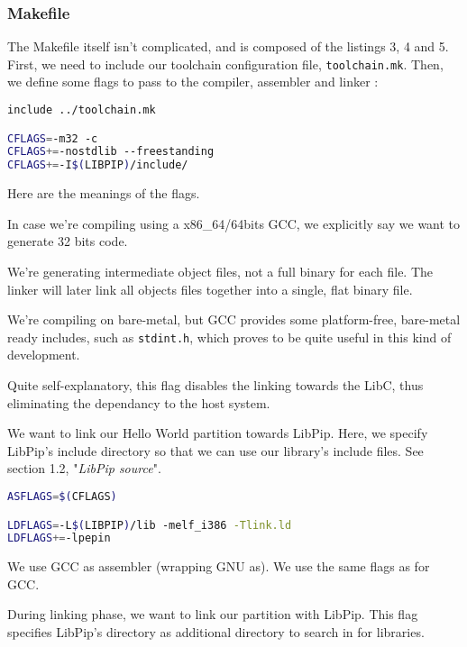 \documentclass[10pt,a4paper,titlepage]{refart}
\begin{document}
\subsubsection{Makefile}
The Makefile itself isn't complicated, and is composed of the listings 3, 4 and 5. First, we need to include our toolchain configuration file, \texttt{toolchain.mk}. Then, we define some flags to pass to the compiler, assembler and linker :
 \begin{lstlisting}[language=bash,caption={Makefile GCC flags}]
include ../toolchain.mk

CFLAGS=-m32 -c
CFLAGS+=-nostdlib --freestanding
CFLAGS+=-I$(LIBPIP)/include/
\end{lstlisting}

Here are the meanings of the flags. 

In case we're compiling using a x86\_64/64bits GCC, we explicitly say we want to generate 32 bits code.

We're generating intermediate object files, not a full binary for each file. The linker will later link all objects files together into a single, flat binary file.

We're compiling on bare-metal, but GCC provides some platform-free, bare-metal ready includes, such as \texttt{stdint.h}, which proves to be quite useful in this kind of development. 

Quite self-explanatory, this flag disables the linking towards the LibC, thus eliminating the dependancy to the host system.

We want to link our Hello World partition towards LibPip. Here, we specify LibPip's include directory so that we can use our library's include files. See section 1.2, "\textit{LibPip source}".

\begin{lstlisting}[language=bash,caption={Makefile GAS and LD flags}]
ASFLAGS=$(CFLAGS)

LDFLAGS=-L$(LIBPIP)/lib -melf_i386 -Tlink.ld
LDFLAGS+=-lpepin
\end{lstlisting}

We use GCC as assembler (wrapping GNU as). We use the same flags as for GCC.

During linking phase, we want to link our partition with LibPip. This flag specifies LibPip's directory as additional directory to search in for libraries.
\end{document}

